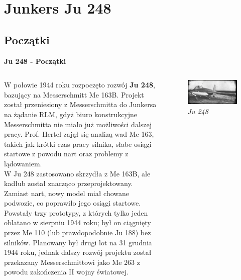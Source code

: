 \section{\large{\textbf{Junkers Ju 248}}}

\subsection{Początki}


\begin{frame}{\Huge{\textbf{Ju 248 - Początki}}}
	\begin{columns}
			\justifying

W połowie 1944 roku rozpoczęto rozwój \textbf{Ju 248}, bazujący na Messerschmitt Me 163B. Projekt został przeniesiony z Messerschmitta do Junkersa na żądanie RLM, gdyż biuro konstrukcyjne Messerschmitta nie miało już możliwości dalszej pracy. Prof. Hertel zajął się analizą wad Me 163, takich jak krótki czas pracy silnika, słabe osiągi startowe z powodu nart oraz problemy z lądowaniem. \\
W Ju 248 zastosowano skrzydła z Me 163B, ale kadłub został znacząco przeprojektowany. Zamiast nart, nowy model miał chowane podwozie, co poprawiło jego osiągi startowe. Powstały trzy prototypy, z których tylko jeden oblatano w sierpniu 1944 roku; był on ciągnięty przez Me 110 (lub prawdopodobnie Ju 188) bez silników. Planowany był drugi lot na 31 grudnia 1944 roku, jednak dalszy rozwój projektu został przekazany Messerschmittowi jako Me 263 z powodu zakończenia II wojny światowej. 

			\begin{figure}
				\centering
				\includegraphics[scale=0.21]{images/ju248-01.jpg}
				\caption{\textit{Ju 248}}
			\end{figure}
	\end{columns}
\end{frame}


